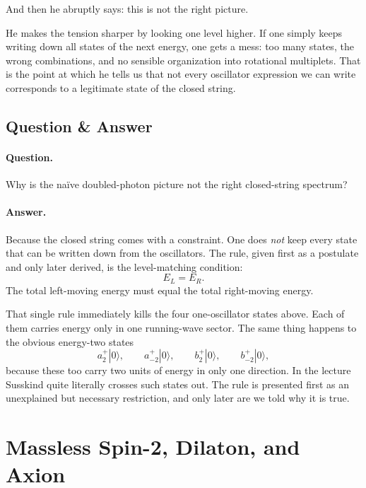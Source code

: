 And then he abruptly says: this is not the right picture.

He makes the tension sharper by looking one level higher. If one simply keeps writing down all states of the next energy, one gets a mess: too many states, the wrong combinations, and no sensible organization into rotational multiplets. That is the point at which he tells us that not every oscillator expression we can write corresponds to a legitimate state of the closed string.

\subsection{Question \& Answer}

\paragraph{Question.} Why is the naïve doubled-photon picture not the right closed-string spectrum?

\paragraph{Answer.} Because the closed string comes with a constraint. One does \emph{not} keep every state that can be written down from the oscillators. The rule, given first as a postulate and only later derived, is the level-matching condition:
\begin{equation}
E_L=E_R.
\end{equation}
The total left-moving energy must equal the total right-moving energy.

That single rule immediately kills the four one-oscillator states above. Each of them carries energy only in one running-wave sector. The same thing happens to the obvious energy-two states
\begin{equation}
a_2^+|0\rangle,\qquad
a_{-2}^+|0\rangle,\qquad
b_2^+|0\rangle,\qquad
b_{-2}^+|0\rangle,
\end{equation}
because these too carry two units of energy in only one direction. In the lecture Susskind quite literally crosses such states out. The rule is presented first as an unexplained but necessary restriction, and only later are we told why it is true.

\section{Massless Spin-2, Dilaton, and Axion}

